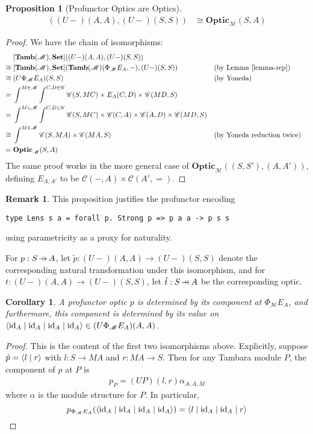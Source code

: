 \documentclass[11pt,letterpaper]{article}
\theoremstyle{plain}
\newtheorem{proposition}[theorem]{Proposition}
\newtheorem{corollary}[theorem]{Corollary}
\theoremstyle{definition}
\newtheorem{remark}[theorem]{Remark}
\newcommand{\C}{\mathscr{C}}
\newcommand{\M}{\mathscr{M}}
\newcommand{\Pastro}{\Phi}
\newcommand{\Set}{\mathbf{Set}}
\newcommand{\Tamb}{\mathbf{Tamb}}
\newcommand{\Optic}{\mathbf{Optic}}
\newcommand{\id}{\mathrm{id}}
\newcommand{\rep}[2]{{\ensuremath \left\langle #1 \mid #2 \right\rangle}}
\newcommand{\repfour}[4]{{\ensuremath \langle #1 \mid #2 \mid #3 \mid #4 \rangle}}
\newcommand{\hto}{\ensuremath{\,\mathaccent\shortmid\rightarrow\,}}
\begin{document}
\begin{proposition}[Profunctor Optics are Optics]\label{prop:profunctor-optics-are-optics}
  \begin{align*}
    [\Tamb(\M), \Set]((U-)(A,A),(U-)(S,S)) &\cong \Optic_\M(S, A)
  \end{align*}
\end{proposition}
\begin{proof}
  We have the chain of isomorphisms:
  \begin{align*}
    &[\Tamb(\M), \Set]((U-)(A,A),(U-)(S,S)) \\
    \cong \;&[\Tamb(\M), \Set](\Tamb(\M)(\Pastro_\M E_A, -), (U-)(S,S))  && \text{(by Lemma~\ref{lemma-rep})}\\
    \cong \;&(U\Pastro_\M E_A)(S,S)  && \text{(by Yoneda)} \\
    = \;&\int^{M \in \M} \int^{C,D \in \C} \C(S, MC) \times E_A(C,D) \times \C(MD,S) \\
    = \;&\int^{M \in \M} \int^{C,D \in \C} \C(S, MC) \times \C(C,A) \times \C(A,D) \times \C(MD,S) \\
    \cong \;&\int^{M \in \M} \C(S, MA) \times \C(MA, S)  && \text{(by Yoneda reduction twice)} \\
    = \;&\Optic_\M(S, A)
  \end{align*}
  The same proof works in the more general case of $\Optic_\M((S, S'), (A,A'))$, defining $E_{A, A'}$ to be $\C(-, A) \times \C(A', {=})$.
\end{proof}

\begin{remark}
  This proposition justifies the profunctor encoding
\begin{verbatim}
type Lens s a = forall p. Strong p => p a a -> p s s
\end{verbatim}
  using parametricity as a proxy for naturality.
\end{remark}

For $p : S \hto A$, let $\tilde{p} : (U-)(A,A) \rightarrow (U-)(S,S)$ denote the corresponding natural transformation under this isomorphism, and for $t : (U-)(A,A) \rightarrow (U-)(S,S)$, let $\hat{t} : S \hto A$ be the corresponding optic.

\begin{corollary}
  A profunctor optic $p$ is determined by its component at $\Pastro_\M E_A$, and furthermore, this component is determined by its value on $\repfour{\id_A}{\id_A}{\id_A}{\id_A} \in (U \Pastro_\M E_A)(A, A)$.
\end{corollary}
\begin{proof}
  This is the content of the first two isomorphisms above. Explicitly, suppose $\hat{p} = \rep{l}{r}$ with $l : S \to MA$ and $r : MA \to S$. Then for any Tambara module $P$, the component of $p$ at $P$ is
  \begin{align*}
    p_P = (UP)(l,r) \alpha_{A,A,M}
  \end{align*}
  where $\alpha$ is the module structure for $P$. In particular,
  \[
    p_{\Pastro_\M E_A}(\repfour{\id_A}{\id_A}{\id_A}{\id_A}) = \repfour{l}{\id_A}{\id_A}{r}
  \]
\end{proof}
\end{document}
